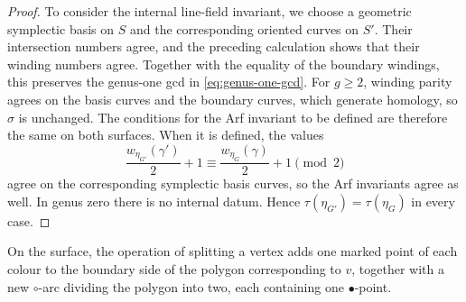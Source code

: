 \documentclass[11pt]{amsart}
\theoremstyle{definition}
\theoremstyle{plain}
\theoremstyle{definition}
\theoremstyle{definition}
\begin{document}
\begin{proof}
To consider the internal line-field invariant, we choose a geometric symplectic basis on $S$ and the corresponding
oriented curves on $S'$.  Their intersection numbers agree,
and the preceding calculation shows that their winding numbers
agree.  Together with the equality of the boundary windings,
this preserves the genus-one gcd in \eqref{eq:genus-one-gcd}.
For $g\geq2$, winding parity agrees on the basis curves and the
boundary curves, which generate homology, so $\sigma$ is
unchanged.  The conditions for the Arf invariant to be defined
are therefore the same on both surfaces.  When it is defined,
the values
\[
  \frac{w_{\eta_{G'}}(\gamma')}{2}+1
  \equiv
  \frac{w_{\eta_G}(\gamma)}{2}+1
  \pmod2
\]
agree on the corresponding symplectic basis curves, so the
Arf invariants agree as well.  In genus zero there is no
internal datum.  Hence
$\tau(\eta_{G'})=\tau(\eta_G)$ in every case.
\end{proof}
On the surface, the operation of splitting a vertex adds one marked point of each
colour to the boundary side of the polygon corresponding to
$v$, together with a new $\circ$-arc dividing the polygon
into two, each containing one $\bullet$-point.
\end{document}
